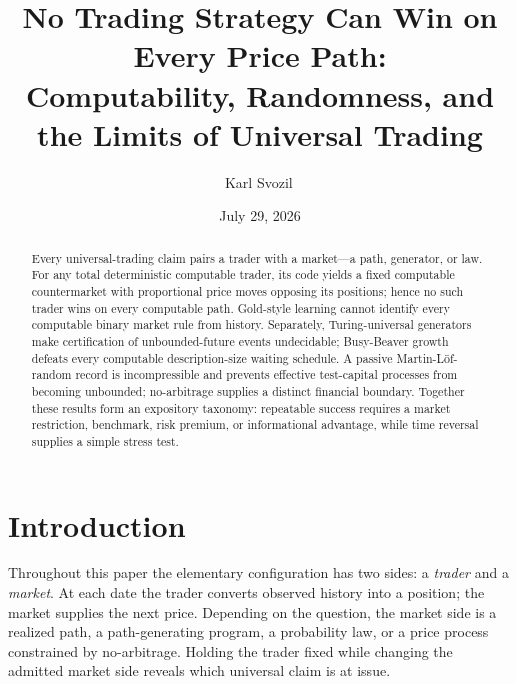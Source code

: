 \documentclass[aps,pra,reprint,superscriptaddress,amsmath,amssymb,floatfix]{revtex4-2}
\theoremstyle{plain}
\theoremstyle{definition}
\theoremstyle{remark}
\begin{document}
\title{No Trading Strategy Can Win on Every Price Path:\\
Computability, Randomness, and the Limits of Universal Trading}

\author{Karl Svozil\,}

\date{July 29, 2026}

\begin{abstract}
Every universal-trading claim pairs a trader with a market---a path, generator,
or law. For any total deterministic computable trader, its code yields a fixed
computable countermarket with proportional price moves opposing its positions;
hence no such trader wins on every computable path. Gold-style learning cannot
identify every computable binary market rule from history. Separately,
Turing-universal generators make certification of unbounded-future events
undecidable; Busy-Beaver growth defeats every computable description-size
waiting schedule. A passive Martin-L\"of-random record is incompressible and
prevents effective test-capital processes from becoming unbounded;
no-arbitrage supplies a distinct financial boundary. Together these results
form an expository taxonomy: repeatable success requires a market restriction,
benchmark, risk premium, or informational advantage, while time reversal
supplies a simple stress test.
\end{abstract}

\maketitle

\section{Introduction}
\label{sec:intro}

Throughout this paper the elementary configuration has two sides: a
\emph{trader} and a \emph{market}. At each date the trader converts observed
history into a position; the market supplies the next price. Depending on the
question, the market side is a realized path, a path-generating program, a
probability law, or a price process constrained by no-arbitrage. Holding the
trader fixed while changing the admitted market side reveals which universal
claim is at issue.
\end{document}
